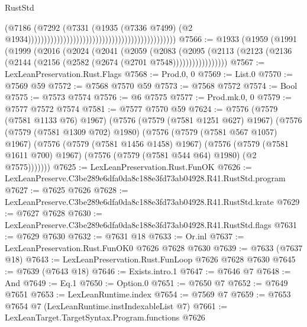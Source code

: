\begin{lexlean}{RustStd}
\begin{coremodule}
                                                                                      (@7186
                                                                                        (@7292
                                                                                          (@7331
                                                                                            (@1935
                                                                                              (@7336
                                                                                                @7499)
                                                                                              (@2
                                                                                                @1934))))))))))))))))))))))))))))))))))))))))))))))
@7566 := @1933
    (@1959
      (@1991
        (@1999
          (@2016
            (@2024
              (@2041
                (@2059
                  (@2083
                    (@2095
                      (@2113 (@2123 (@2136 (@2144 (@2156 (@2582 (@2674 (@2701 @7548)))))))))))))))))
@7567 := LexLeanPreservation.Rust.Flags
@7568 := Prod.{0, 0}
@7569 := List.{0}
@7570 := @7569 @59
@7572 := @7568 @7570 @59
@7573 := @7568 @7572
@7574 := Bool
@7575 := @7573 @7574
@7576 := @6 @7575
@7577 := Prod.mk.{0, 0}
@7579 := @7577 @7572 @7574
@7581 := @7577 @7570 @59
@7624 := @7576
    (@7579 (@7581 @1133 @76) @1967)
    (@7576
      (@7579 (@7581 @1251 @627) @1967)
      (@7576
        (@7579 (@7581 @1309 @702) @1980)
        (@7576
          (@7579 (@7581 @567 @1057) @1967)
          (@7576
            (@7579 (@7581 @1456 @1458) @1967)
            (@7576
              (@7579 (@7581 @1611 @700) @1967)
              (@7576 (@7579 (@7581 @544 @64) @1980) (@2 @7575)))))))
@7625 := LexLeanPreservation.Rust.FunOK
@7626 := LexLeanPreserve.C3be289e6dfa0da8c188e3fd73ab04928.R41.RustStd.program
@7627 := @7625 @7626
@7628 := LexLeanPreserve.C3be289e6dfa0da8c188e3fd73ab04928.R41.RustStd.krate
@7629 := @7627 @7628
@7630 := LexLeanPreserve.C3be289e6dfa0da8c188e3fd73ab04928.R41.RustStd.flags
@7631 := @7629 @7630
@7632 := @7631 @18
@7633 := Or.inl
@7637 := LexLeanPreservation.Rust.FunOK0 @7626 @7628 @7630
@7639 := @7633 (@7637 @18)
@7643 := LexLeanPreservation.Rust.FunLoop @7626 @7628 @7630
@7645 := @7639 (@7643 @18)
@7646 := Exists.intro.{1}
@7647 := @7646 @7
@7648 := And
@7649 := Eq.{1}
@7650 := Option.{0}
@7651 := @7650 @7
@7652 := @7649 @7651
@7653 := LexLeanRuntime.index
@7654 := @7569 @7
@7659 := @7653 @7654 @7 (LexLeanRuntime.instIndexableList @7)
@7661 := LexLeanTarget.TargetSyntax.Program.functions @7626

\end{coremodule}
\end{lexlean}
